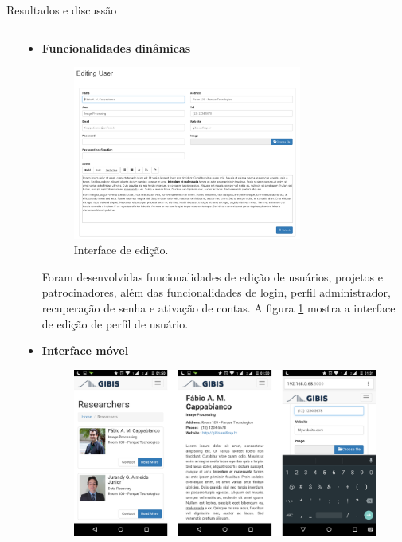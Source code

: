 \documentclass[final]{beamer} %
\begin{document}
\begin{frame}[t]
\begin{columns}[t]
\begin{column}{0.60\paperwidth}
\begin{block}{Resultados e discussão}
\begin{columns}[t,totalwidth=0.60\paperwidth]
\begin{column}{0.28\paperwidth}
\begin{itemize}
				\end{itemize}
			\end{column}
			\begin{column}{0.28\paperwidth}
				\begin{itemize}
					\item {\bf Funcionalidades dinâmicas}\\
					\begin{figure}[ht]
						\begin{center}
							\includegraphics[width=0.75\textwidth]{./figures/edicao}
							\caption{Interface de edição. \label{fig:edicao}}
						\end{center}
					\end{figure}
					Foram desenvolvidas funcionalidades de edição de usuários, projetos e patrocinadores, além das funcionalidades de login, perfil administrador, recuperação de senha e ativação de contas. A figura \ref{fig:edicao} mostra a interface de edição de perfil de usuário.
					\item {\bf Interface móvel}\\
					\begin{figure}[ht]
						\begin{center}
							\includegraphics[width=1.0\textwidth]{./figures/mobile}

\end{center}
\end{figure}
\end{itemize}
\end{column}
\end{columns}
\end{block}
\end{column}
\end{columns}
\end{frame}
\end{document}
